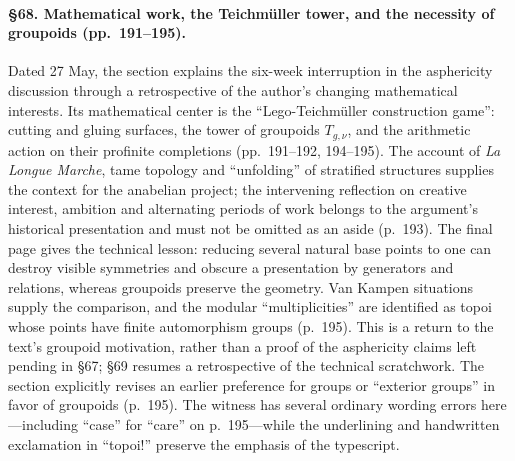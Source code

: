 \paragraph{\S68. Mathematical work, the Teichmüller tower, and the necessity of groupoids (pp.\ 191--195).}
Dated 27 May, the section explains the six-week interruption in the asphericity discussion through a retrospective of the author's changing mathematical interests. Its mathematical center is the ``Lego-Teichmüller construction game'': cutting and gluing surfaces, the tower of groupoids $T_{g,\nu}$, and the arithmetic action on their profinite completions (pp.\ 191--192, 194--195). The account of \emph{La Longue Marche}, tame topology and ``unfolding'' of stratified structures supplies the context for the anabelian project; the intervening reflection on creative interest, ambition and alternating periods of work belongs to the argument's historical presentation and must not be omitted as an aside (p.\ 193). The final page gives the technical lesson: reducing several natural base points to one can destroy visible symmetries and obscure a presentation by generators and relations, whereas groupoids preserve the geometry. Van Kampen situations supply the comparison, and the modular ``multiplicities'' are identified as topoi whose points have finite automorphism groups (p.\ 195). This is a return to the text's groupoid motivation, rather than a proof of the asphericity claims left pending in \S67; \S69 resumes a retrospective of the technical scratchwork. The section explicitly revises an earlier preference for groups or ``exterior groups'' in favor of groupoids (p.\ 195). The witness has several ordinary wording errors here---including ``case'' for ``care'' on p.\ 195---while the underlining and handwritten exclamation in ``topoi!'' preserve the emphasis of the typescript.

